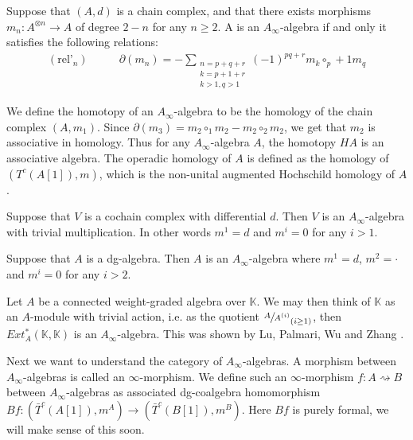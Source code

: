 \documentclass[../thesis.tex]{subfiles}
\begin{document}
        \begin{proposition}
            Suppose that $(A, d)$ is a chain complex, and that there exists morphisms $m_n: A^{\otimes n} \rightarrow A$ of degree $2-n$ for any $n\geq 2$. A is an $A_\infty$-algebra if and only it satisfies the following relations:
            \begin{align*}
                (\text{rel'}_n)\qquad & \partial(m_n) = -\sum_{\substack{n = p + q + r \\ k = p + 1 + r \\ k > 1, q > 1}}(-1)^{pq + r}m_k\circ_p+1m_q
            \end{align*}
        \end{proposition}

        We define the homotopy of an $A_\infty$-algebra to be the homology of the chain complex $(A, m_1)$. Since $\partial(m_3) = m_2\circ_1m_2 - m_2\circ_2m_2$, we get that $m_2$ is associative in homology. Thus for any $A_\infty$-algebra $A$, the homotopy $HA$ is an associative algebra. The operadic homology of $A$ is defined as the homology of $(T^c(A[1]), m)$, which is the non-unital augmented Hochschild homology of $A$.

        \begin{example}
            Suppose that $V$ is a cochain complex with differential $d$. Then $V$ is an $A_\infty$-algebra with trivial multiplication. In other words $m^1 = d$ and $m^i = 0$ for any $i>1$.
        \end{example}

        \begin{example}
            Suppose that $A$ is a dg-algebra. Then $A$ is an $A_\infty$-algebra where $m^1 = d$, $m^2 = \cdot$ and $m^i=0$ for any $i>2$.
        \end{example}

        \begin{example}
            Let $A$ be a connected weight-graded algebra over $\mathbb{K}$. We may then think of $\mathbb{K}$ as an $A$-module with trivial action, i.e. as the quotient $\sfrac{A}{A^{(i)}}_{(i\geq 1)}$, then $Ext^*_A(\mathbb{K},\mathbb{K})$ is an $A_\infty$-algebra. This was shown by Lu, Palmari, Wu and Zhang \cite{Lu06}.
        \end{example}

        Next we want to understand the category of $A_\infty$-algebras. A morphism between $A_\infty$-algebras is called an $\infty$-morphism. We define such an $\infty$-morphism $f:A\rightsquigarrow B$ between $A_\infty$-algebras as associated dg-coalgebra homomorphism $Bf:(\bar{T}^c(A[1]), m^A)\rightarrow (\bar{T}^c(B[1]), m^B)$. Here $Bf$ is purely formal, we will make sense of this soon.
\end{document}
